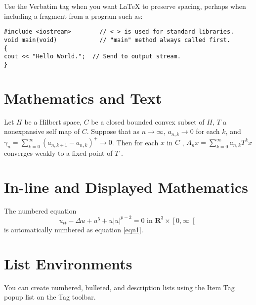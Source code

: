 \documentclass{amsbook}
\theoremstyle{plain}
\numberwithin{equation}{chapter}
\begin{document}
Use the Verbatim tag when you want \LaTeX{} to preserve spacing, perhaps
when including a fragment from a program such as:
\begin{verbatim}
#include <iostream>        // < > is used for standard libraries.
void main(void)            // "main" method always called first.
{
cout << "Hello World.";  // Send to output stream.
}
\end{verbatim}

\section{Mathematics and Text}

Let $H$ be a Hilbert space, $C$ be a closed bounded convex subset of $H$, $T$
a nonexpansive self map of $C$. Suppose that as $n\rightarrow \infty $, $%
a_{n,k}\rightarrow 0$ for each $k$, and $\gamma _{n}=\sum_{k=0}^{\infty
}\left( a_{n,k+1}-a_{n,k}\right) ^{+}\rightarrow 0$. Then for each $x$ in $C$%
, $A_{n}x=\sum_{k=0}^{\infty }a_{n,k}T^{k}x$ converges weakly to a fixed
point of $T$ .

\section{In-line and Displayed Mathematics}

The numbered equation
\begin{equation}
u_{tt}-\Delta u+u^{5}+u\left| u\right| ^{p-2}=0\text{ in }\mathbf{R}%
^{3}\times \left[ 0,\infty \right[  \label{eqn1}
\end{equation}%
is automatically numbered as equation \ref{eqn1}.

\section{List Environments}

You can create numbered, bulleted, and description lists using the Item Tag popup
list on the Tag toolbar.
\end{document}
